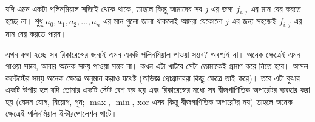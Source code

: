 যদি এমন একটা পলিনমিয়াল সত্যিই থেকে থাকে, তাহলে কিন্তু আমাদের সব $j$ এর জন্য $f_{i, j}$ এর মান বের করতে হচ্ছে না। শুধু $a_{0}, a_{1}, a_{2}, \dots, a_{n}$ এর মান গুলো জানা থাকলেই আমরা যেকোনো $j$ এর জন্য সহজেই $f_{i, j}$ এর মান বের করতে পারব। 

এখন কথা হচ্ছে সব রিকারেন্সের জন্যই এমন একটি পলিনমিয়াল পাওয়া সম্ভব? অবশ্যই না। অনেক ক্ষেত্রেই এমন পাওয়া সম্ভব, আবার অনেক সময় পাওয়া সম্ভব না। কখন এটা খাটবে সেটা তোমাকেই প্রমাণ করে নিতে হবে। আসল কন্টেস্টের সময় অনেক ক্ষেত্রে অনুমান করাও যথেষ্ট (অভিজ্ঞ প্রোগ্রামাররা কিছু ক্ষেত্রে তাই করে)।  তবে এটা বুঝার একটি উপায় হল যদি তোমার একটি স্টেট বেশ বড় হয় এবং রিকারেন্সের মধ্যে সব বীজগাণিতিক অপারেটর ব্যবহার করা হয় (যেমন যোগ, বিয়োগ, গুন; $\max$, $\min$, $\text{xor}$ এসব কিন্তু বীজগাণিতিক অপারেটর নয়) তাহলে অনেক ক্ষেত্রেই পলিনমিয়াল  ইন্টারপোলেশন খাটে।  

